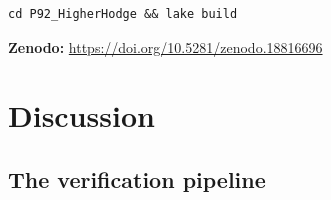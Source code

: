 \documentclass[11pt]{article}
\theoremstyle{plain}
\theoremstyle{definition}
\theoremstyle{remark}
\begin{document}
\begin{lstlisting}[style=leanstyle,numbers=none]
cd P92_HigherHodge && lake build
\end{lstlisting}

\noindent
\textbf{Zenodo:} \url{https://doi.org/10.5281/zenodo.18816696}

\section{Discussion}
\label{sec:discussion}

\subsection{The verification pipeline}
\end{document}

